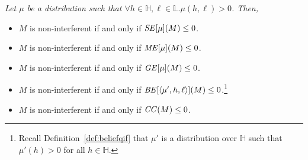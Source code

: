 \documentclass{llncs}
\newenvironment{reftheorem}[1]{\begin{trivlist}\item[\hskip
      \labelsep{\bf Theorem #1.}]\it}{\end{trivlist}}
\newcommand{\aseq}[1]{\langle#1\rangle}
\begin{document}
\begin{reftheorem}{\ref{thm:nonint}}
Let $\mu$ be a distribution such that $\forall
h\in\mathbb{H},\ell\in\mathbb{L}.\mu(h,\ell)>0$.  Then,
\begin{itemize}
\item $M$ is non-interferent if and only if ${\it SE}[\mu](M) \leq 0$.
\item $M$ is non-interferent if and only if ${\it ME}[\mu](M) \leq 0$.
\item $M$ is non-interferent if and only if ${\it GE}[\mu](M) \leq 0$.
\item $M$ is non-interferent if and only if ${\it BE}[\aseq{\mu',h,\ell}](M)\le 0$.\footnote{Recall Definition~\ref{def:beliefqif} that $\mu'$ is a
distribution over $\mathbb{H}$ such that $\mu'(h) > 0$ for all $h \in
\mathbb{H}$.}
\item $M$ is non-interferent if and only if ${\it CC}(M) \leq 0$.  
\end{itemize}
\end{reftheorem}
\end{document}
